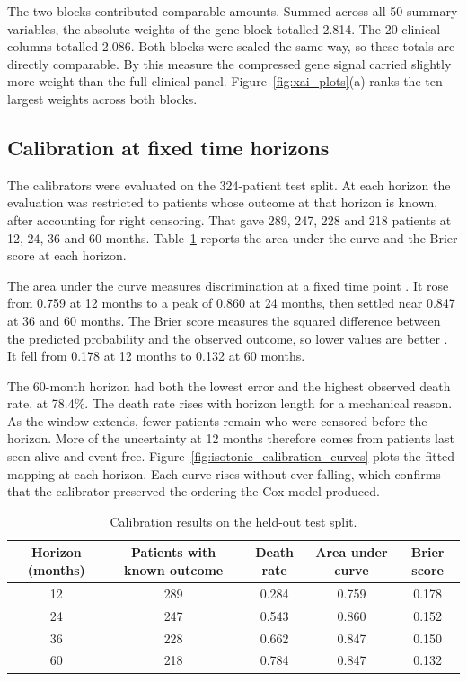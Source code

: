 \documentclass[10pt,a4paper]{article}
\begin{document}
The two blocks contributed comparable amounts. Summed across all 50 summary
variables, the absolute weights of the gene block totalled 2.814. The 20
clinical columns totalled 2.086. Both blocks were scaled the same way, so these
totals are directly comparable. By this measure the compressed gene signal
carried slightly more weight than the full clinical panel.
Figure~\ref{fig:xai_plots}(a) ranks the ten largest weights across both blocks.

\subsection{Calibration at fixed time horizons}

The calibrators were evaluated on the 324-patient test split. At each horizon
the evaluation was restricted to patients whose outcome at that horizon is
known, after accounting for right censoring. That gave 289, 247, 228 and 218
patients at 12, 24, 36 and 60 months. Table~\ref{tab:horizon_metrics} reports
the area under the curve and the Brier score at each horizon.

The area under the curve measures discrimination at a fixed time point
\citep{heagerty2005survival}. It rose from 0.759 at 12 months to a peak of 0.860
at 24 months, then settled near 0.847 at 36 and 60 months. The Brier score
measures the squared difference between the predicted probability and the
observed outcome, so lower values are better \citep{graf1999assessment}. It fell
from 0.178 at 12 months to 0.132 at 60 months.

The 60-month horizon had both the lowest error and the highest observed death
rate, at 78.4\%. The death rate rises with horizon length for a mechanical
reason. As the window extends, fewer patients remain who were censored before
the horizon. More of the uncertainty at 12 months therefore comes from patients
last seen alive and event-free. Figure~\ref{fig:isotonic_calibration_curves}
plots the fitted mapping at each horizon. Each curve rises without ever falling,
which confirms that the calibrator preserved the ordering the Cox model
produced.

\begin{table}[!htbp]
\centering
\caption{Calibration results on the held-out test split.}
\label{tab:horizon_metrics}
\begin{tabular}{ccccc}
\toprule
Horizon (months) & Patients with known outcome & Death rate & Area under curve & Brier score \\
\midrule
12 & 289 & 0.284 & 0.759 & 0.178 \\
24 & 247 & 0.543 & 0.860 & 0.152 \\
36 & 228 & 0.662 & 0.847 & 0.150 \\
60 & 218 & 0.784 & 0.847 & 0.132 \\
\bottomrule
\end{tabular}
\end{table}
\end{document}
